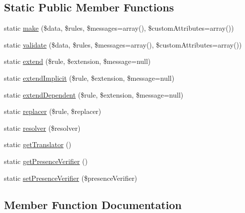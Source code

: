 \subsection*{Static Public Member Functions}
\begin{DoxyCompactItemize}
\item 
static \mbox{\hyperlink{class_illuminate_1_1_support_1_1_facades_1_1_validator_aa405d297def24014195e5344cde1629d}{make}} (\$data, \$rules, \$messages=array(), \$custom\+Attributes=array())
\item 
static \mbox{\hyperlink{class_illuminate_1_1_support_1_1_facades_1_1_validator_ada312162486fd32605e929f0adbd159b}{validate}} (\$data, \$rules, \$messages=array(), \$custom\+Attributes=array())
\item 
static \mbox{\hyperlink{class_illuminate_1_1_support_1_1_facades_1_1_validator_ab62de1b0f72bb2f0d34b604da3639234}{extend}} (\$rule, \$extension, \$message=null)
\item 
static \mbox{\hyperlink{class_illuminate_1_1_support_1_1_facades_1_1_validator_aae4ed067cf9ab704c87927fb20d2d7ca}{extend\+Implicit}} (\$rule, \$extension, \$message=null)
\item 
static \mbox{\hyperlink{class_illuminate_1_1_support_1_1_facades_1_1_validator_a25855ea98e81cde559ed3fe966d226a0}{extend\+Dependent}} (\$rule, \$extension, \$message=null)
\item 
static \mbox{\hyperlink{class_illuminate_1_1_support_1_1_facades_1_1_validator_a6b34123d298bc7987bc0b55bf64e3ded}{replacer}} (\$rule, \$replacer)
\item 
static \mbox{\hyperlink{class_illuminate_1_1_support_1_1_facades_1_1_validator_a285f6c80782f7230fc19ce8af1b7d7e0}{resolver}} (\$resolver)
\item 
static \mbox{\hyperlink{class_illuminate_1_1_support_1_1_facades_1_1_validator_a594cae35bdb1c8a243d23204d518dccf}{get\+Translator}} ()
\item 
static \mbox{\hyperlink{class_illuminate_1_1_support_1_1_facades_1_1_validator_add3dea45d35651ca9ca5ecdb677db5ad}{get\+Presence\+Verifier}} ()
\item 
static \mbox{\hyperlink{class_illuminate_1_1_support_1_1_facades_1_1_validator_a44e469a5e37d02e59dbb1222ca53c27d}{set\+Presence\+Verifier}} (\$presence\+Verifier)
\end{DoxyCompactItemize}


\subsection{Member Function Documentation}
\mbox{\label{class_illuminate_1_1_support_1_1_facades_1_1_validator_ab62de1b0f72bb2f0d34b604da3639234}} 
